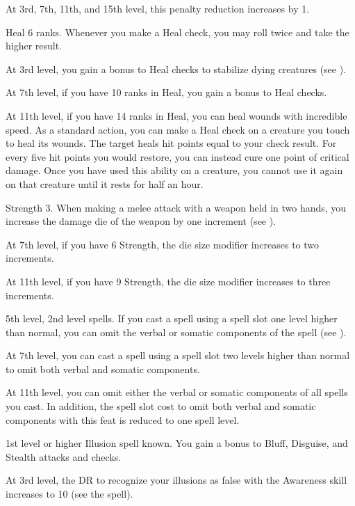     At 3rd, 7th, 11th, and 15th level, this penalty reduction increases by 1.

    \featpre Heal 6 ranks.
    \featben Whenever you make a Heal check, you may roll twice and take the higher result.

    At 3rd level, you gain a  bonus to Heal checks to stabilize dying creatures (see ).

    At 7th level, if you have 10 ranks in Heal, you gain a  bonus to Heal checks.

    At 11th level, if you have 14 ranks in Heal, you can heal wounds with incredible speed.
    As a standard action, you can make a Heal check on a creature you touch to heal its wounds.
    The target heals hit points equal to your check result.
    For every five hit points you would restore, you can instead cure one point of critical damage.
    Once you have used this ability on a creature, you cannot use it again on that creature until it rests for half an hour.

    \featpre Strength 3.
    \featben When making a melee attack with a weapon held in two hands, you increase the damage die of the weapon by one increment (see ).

    At 7th level, if you have 6 Strength, the die size modifier increases to two increments.

    At 11th level, if you have 9 Strength, the die size modifier increases to three increments.

    \featpre 5th level, 2nd level spells.
    \featben If you cast a spell using a spell slot one level higher than normal, you can omit the verbal or somatic components of the spell (see ).

    At 7th level, you can cast a spell using a spell slot two levels higher than normal to omit both verbal and somatic components.

    At 11th level, you can omit either the verbal or somatic components of all spells you cast.
    In addition, the spell slot cost to omit both verbal and somatic components with this feat is reduced to one spell level.

    \featpre 1st level or higher Illusion spell known.
    \featben You gain a  bonus to Bluff, Disguise, and Stealth attacks and checks.

    At 3rd level, the DR to recognize your illusions as false with the Awareness skill increases to 10 (see the  spell).

